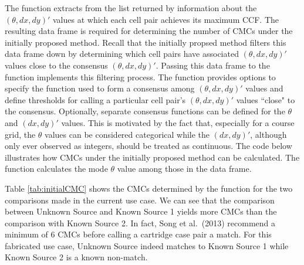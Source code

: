 The  function extracts from the list
returned by  information about the \((\theta,dx,dy)'\)
values at which each cell pair achieves its maximum CCF. The resulting
data frame is required for determining the number of CMCs under the
initially proposed method. Recall that the initially propsed method
filters this data frame down by determining which cell pairs have
associated \((\theta,dx,dy)'\) values close to the consensus
\((\theta,dx,dy)'\). Passing this data frame to the
 function implements this filtering process. The
 function provides options to specify the function used
to form a consensus among \((\theta,dx,dy)'\) values and define
thresholds for calling a particular cell pair's \((\theta,dx,dy)'\)
values ``close" to the consensus. Optionally, separate consensus
functions can be defined for the \(\theta\) and \((dx,dy)'\) values.
This is motivated by the fact that, especially for a course grid, the
\(\theta\) values can be considered categorical while the \((dx,dy)'\),
although only ever observed as integers, should be treated as
continuous. The code below illustrates how CMCs under the initially
proposed method can be calculated. The  function
calculates the mode \(\theta\) value among those in the
 data frame.

\begin{Schunk}
\end{Schunk}

Table \ref{tab:initialCMC} shows the CMCs determined by the
 function for the two comparisons made in the current
use case. We can see that the comparison between Unknown Source and
Known Source 1 yields more CMCs than the comparison with Known Source 2.
In fact, Song et al.~(2013) recommend a minimum of 6 CMCs before calling
a cartridge case pair a match. For this fabricated use case, Unknown
Source indeed matches to Known Source 1 while Known Source 2 is a known
non-match.

